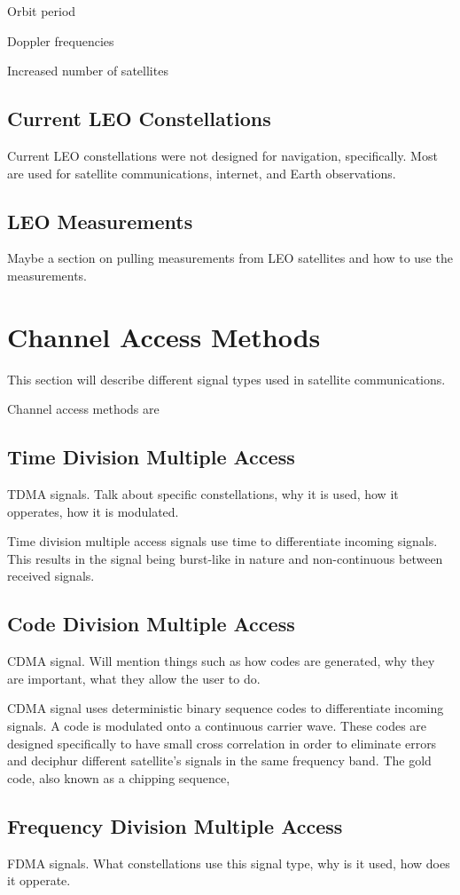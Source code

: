 \documentclass[12pt]{report}
\begin{document}
Orbit period

Doppler frequencies

Increased number of satellites

\subsection{Current LEO Constellations}
Current LEO constellations were not designed for navigation, specifically. Most are used for satellite communications, internet, and Earth observations. 

\subsection{LEO Measurements}
Maybe a section on pulling measurements from LEO satellites and how to use the measurements. 

\section{Channel Access Methods}
This section will describe different signal types used in satellite communications.

Channel access methods are 
\subsection{Time Division Multiple Access}
TDMA signals. Talk about specific constellations, why it is used, how it opperates, how it is modulated. 

Time division multiple access signals use time to differentiate incoming signals. This results in the signal being burst-like in nature and non-continuous between received signals. 

\subsection{Code Division Multiple Access}
CDMA signal. Will mention things such as how codes are generated, why they are important, what they allow the user to do.

CDMA signal uses deterministic binary sequence codes to differentiate incoming signals. A code is modulated onto a continuous carrier wave. These codes are designed specifically to have small cross correlation in order to eliminate errors and deciphur different satellite's signals in the same frequency band. The gold code, also known as a chipping sequence, 

\subsection{Frequency Division Multiple Access}
FDMA signals. What constellations use this signal type, why is it used, how does it opperate. 
\end{document}
